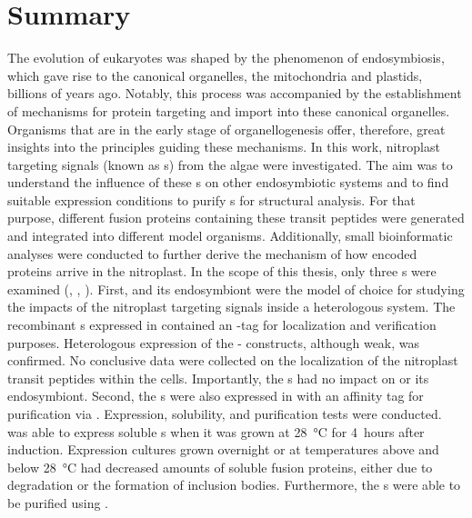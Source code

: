 \chapter{Summary}
The evolution of eukaryotes was shaped by the phenomenon of endosymbiosis, which gave rise to the canonical organelles, the mitochondria and plastids, billions of years ago. Notably, this process was accompanied by the establishment of mechanisms for protein targeting and import into these canonical organelles. Organisms that are in the early stage of organellogenesis offer, therefore, great insights into the principles guiding these mechanisms. 
In this work, nitroplast targeting signals (known as s) from the algae  were investigated. The aim was to understand the influence of these s on other endosymbiotic systems and to find suitable expression conditions to purify s for structural analysis. For that purpose, different fusion proteins containing these transit peptides were generated and integrated into different model organisms. Additionally, small bioinformatic analyses were conducted to further derive the mechanism of how  encoded proteins arrive in the nitroplast. In the scope of this thesis, only three s were examined (, , ). 
First,  and its endosymbiont were the model of choice for studying the impacts of the nitroplast targeting signals inside a heterologous system. The recombinant s expressed in  contained an -tag for localization and verification purposes. Heterologous expression of the - constructs, although weak, was confirmed. No conclusive data were collected on the localization of the nitroplast transit peptides within the cells. Importantly, the s had no impact on  or its endosymbiont.   
Second, the s were also expressed in  with an affinity tag for purification via . Expression, solubility, and purification tests were conducted.  was able to express soluble s when it was grown at 28~°C for 4~hours after induction. Expression cultures grown overnight or at temperatures above and below 28~°C had decreased amounts of soluble fusion proteins, either due to degradation or the formation of inclusion bodies. Furthermore, the s were able to be purified using .
